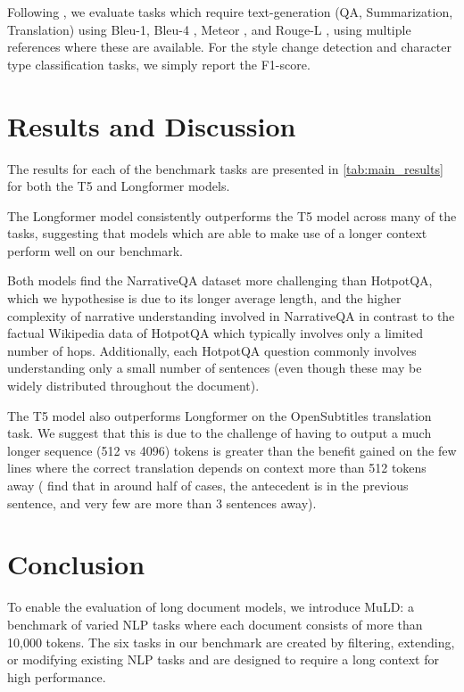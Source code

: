 \documentclass[10pt, a4paper]{article}
\begin{document}
Following \cite{Kocisky_2018}, we evaluate tasks which require text-generation (QA, Summarization, Translation) using Bleu-1, Bleu-4 \cite{Papineni_2002}, Meteor \cite{Denkowski_2011}, and Rouge-L \cite{Lin_2004}, using multiple references where these are available. For the style change detection and character type classification tasks, we simply report the F1-score.
\section{Results and Discussion}

The results for each of the benchmark tasks are presented in \autoref{tab:main_results} for both the T5 and Longformer models.

The Longformer model consistently outperforms the T5 model across many of the tasks, suggesting that models which are able to make use of a longer context perform well on our benchmark. 

Both models find the NarrativeQA dataset more challenging than HotpotQA, which we hypothesise is due to its longer average length, and the higher complexity of narrative understanding involved in NarrativeQA in contrast to the factual Wikipedia data of HotpotQA which typically involves only a limited number of hops. Additionally, each HotpotQA question commonly involves understanding only a small number of sentences (even though these may be widely distributed throughout the document).

The T5 model also outperforms Longformer on the OpenSubtitles translation task. We suggest that this is due to the challenge of having to output a much longer sequence (512 vs 4096) tokens is greater than the benefit gained on the few lines where the correct translation depends on context more than 512 tokens away ( find that in around half of cases, the antecedent is in the previous sentence, and very few are more than 3 sentences away).



\section{Conclusion}
To enable the evaluation of long document models, we introduce MuLD: a benchmark of varied NLP tasks where each document consists of more than 10,000 tokens. The six tasks in our benchmark are created by filtering, extending, or modifying existing NLP tasks and are designed to require a long context for high performance.
\end{document}
